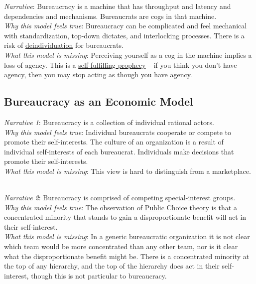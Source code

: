 \textit{Narrative}: Bureaucracy is a machine that has throughput and latency and dependencies and mechanisms. Bureaucrats are cogs in that machine.\\
\textit{Why this model feels true}: Bureaucracy can be complicated and feel mechanical with standardization, top-down dictates, and interlocking processes. There is a risk of \href{https://en.wikipedia.org/wiki/Deindividuation}{deindividuation} 
\iftoggle{WPinmargin}{\marginpar{[Wikipedia] deindividuation}}{}
for bureaucrats. \\
\textit{What this model is missing}: Perceiving yourself as a cog in the machine implies a loss of agency. This is a \href{https://en.wikipedia.org/wiki/Self-fulfilling_prophecy}{self-fulfilling prophecy}
\iftoggle{WPinmargin}{\marginpar{[Wikipedia] self-\\fulfilling prophecy}}{}
-- if you think you don't have agency, then you may stop acting as though you have agency. 


\subsection*{Bureaucracy as an Economic Model}

\textit{Narrative 1}: Bureaucracy is a collection of individual rational actors. \\
\textit{Why this model feels true}: Individual bureaucrats cooperate or compete to promote their self-interests.
The culture of an organization is a result of individual self-interests of each bureaucrat.
Individuals make decisions that promote their self-interests. \\
\textit{What this model is missing}: This view is hard to distinguish from a marketplace. 

\ \\
\textit{Narrative 2}: Bureaucracy is comprised of competing special-interest groups. \\
\textit{Why this model feels true}: The observation of \href{https://en.wikipedia.org/wiki/Public_choice}{Public Choice theory} 
\iftoggle{WPinmargin}{\marginpar{[Wikipedia] Public\\Choice theory}}{}
is that a concentrated minority that stands to gain a disproportionate benefit will act in their self-interest. \\
\textit{What this model is missing}: In a generic bureaucratic organization it is not clear which team would be more concentrated than any other team, nor is it clear what the disproportionate benefit might be. There is a concentrated minority at the top of any hierarchy, and the top of the hierarchy does act in their self-interest, though this is not particular to bureaucracy.

